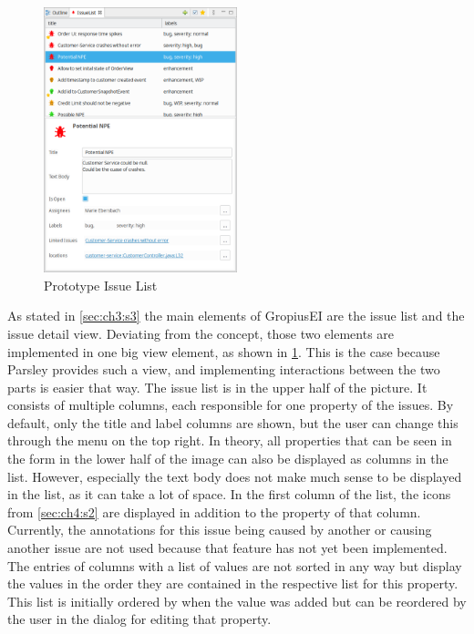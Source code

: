 \begin{figure}[!h]
	\centering
	\includegraphics[width=0.5\textwidth]{graphics/screenshot_gropius_ei_issue_list.png}
	\caption{Prototype Issue List}
	\label{fig:c4:screenshot_issue_list}
\end{figure}
As stated in \cref{sec:ch3:s3} the main elements of \gls{GropiusEI} are the issue list and the issue detail view.
Deviating from the concept, those two elements are implemented in one big view element, as shown in \cref{fig:c4:screenshot_issue_list}.
This is the case because \gls{Parsley} provides such a view, and implementing interactions between the two parts is easier that way.
The issue list is in the upper half of the picture. 
It consists of multiple columns, each responsible for one property of the issues.
By default, only the title and label columns are shown, but the user can change this through the menu on the top right.
In theory, all properties that can be seen in the form in the lower half of the image can also be displayed as columns in the list.
However, especially the text body does not make much sense to be displayed in the list, as it can take a lot of space.
In the first column of the list, the icons from \ref{sec:ch4:s2} are displayed in addition to the property of that column.
Currently, the annotations for this issue being caused by another or causing another issue are not used because that feature has not yet been implemented.
The entries of columns with a list of values are not sorted in any way but display the values in the order they are contained in the respective list for this property.
This list is initially ordered by when the value was added but can be reordered by the user in the dialog for editing that property.

